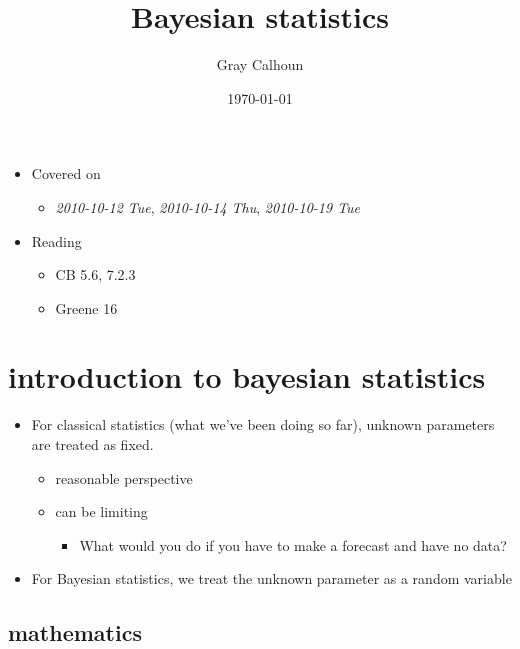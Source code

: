 \documentclass[11pt]{article}
\title{Bayesian statistics}
\author{Gray Calhoun}
\date{\today}
\begin{document}
\maketitle

\setcounter{tocdepth}{2}
\tableofcontents
\vspace*{1cm}
\begin{itemize}
\item Covered on
\begin{itemize}
\item \textit{2010-10-12 Tue}, \textit{2010-10-14 Thu}, \textit{2010-10-19 Tue}
\end{itemize}
\item Reading
\begin{itemize}
\item CB 5.6, 7.2.3
\item Greene 16
\end{itemize}
\end{itemize}
\section{introduction to bayesian statistics}
\label{sec-1}

\begin{itemize}
\item For classical statistics (what we've been doing so far), unknown parameters are treated as fixed.
\begin{itemize}
\item reasonable perspective
\item can be limiting
\begin{itemize}
\item What would you do if you have to make a forecast and have no data?
\end{itemize}
\end{itemize}
\item For Bayesian statistics, we treat the unknown parameter as a
      random variable
\end{itemize}
\subsection{mathematics}
\label{sec-1-1}
\end{document}
